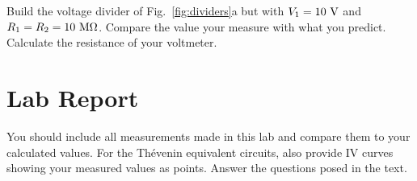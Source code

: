 \documentclass[12pt]{article}
\begin{document}
Build the voltage divider of Fig.~\ref{fig:dividers}a but with $V_1=10~\rm{V}$ and $R_1 = R_2 = 10~\rm{M\Omega}$.  Compare the value your measure with what you predict.  Calculate the resistance of your voltmeter.

%
%

\section{Lab Report}

You should include all measurements made in this lab and compare them to your calculated values.  For the Th\'{e}venin equivalent circuits, also provide IV curves showing your measured values as points.  Answer the questions posed in the text.
 
\end{document}
